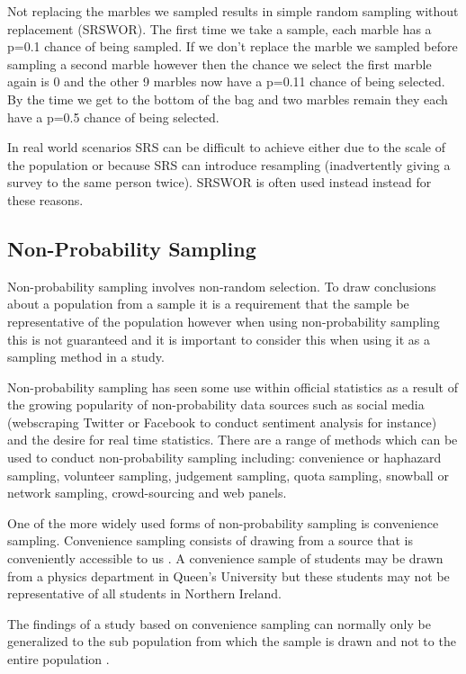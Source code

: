 \documentclass[
]{book}
\begin{document}
Not replacing the marbles we sampled results in simple random sampling without replacement (SRSWOR). The first time we take a sample, each marble has a p=0.1 chance of being sampled. If we don't replace the marble we sampled before sampling a second marble however then the chance we select the first marble again is 0 and the other 9 marbles now have a p=0.11 chance of being selected. By the time we get to the bottom of the bag and two marbles remain they each have a p=0.5 chance of being selected.

In real world scenarios SRS can be difficult to achieve either due to the scale of the population or because SRS can introduce resampling (inadvertently giving a survey to the same person twice). SRSWOR is often used instead instead for these reasons.

\hypertarget{non-probability-sampling}{%
\subsection{Non-Probability Sampling}\label{non-probability-sampling}}

Non-probability sampling involves non-random selection. To draw conclusions about a population from a sample it is a requirement that the sample be representative of the population however when using non-probability sampling this is not guaranteed and it is important to consider this when using it as a sampling method in a study.

Non-probability sampling has seen some use within official statistics as a result of the growing popularity of non-probability data sources such as social media (webscraping Twitter or Facebook to conduct sentiment analysis for instance) and the desire for real time statistics. There are a range of methods which can be used to conduct non-probability sampling including: convenience or haphazard sampling, volunteer sampling, judgement sampling, quota sampling, snowball or network sampling, crowd-sourcing and web panels.

One of the more widely used forms of non-probability sampling is convenience sampling. Convenience sampling consists of drawing from a source that is conveniently accessible to us \citep{andrade}. A convenience sample of students may be drawn from a physics department in Queen's University but these students may not be representative of all students in Northern Ireland.

The findings of a study based on convenience sampling can normally only be generalized to the sub population from which the sample is drawn and not to the entire population \citep{andrade}.
\end{document}
